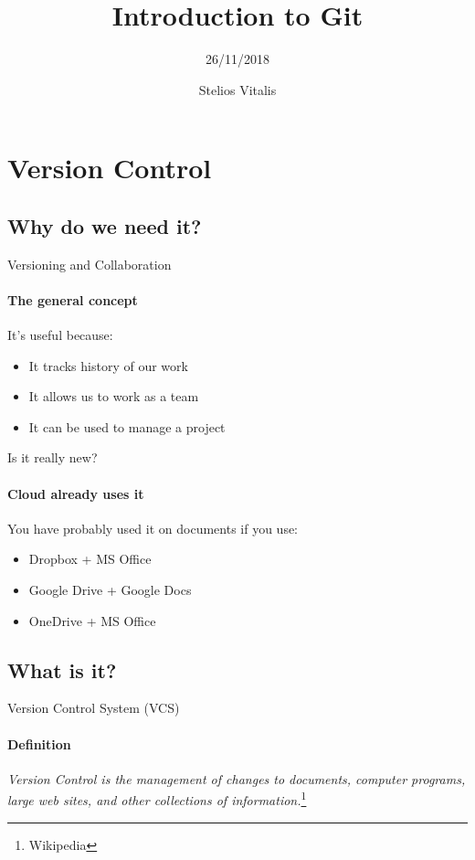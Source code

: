 \documentclass{beamer}
\title{Introduction to Git} %
\subtitle{26/11/2018} %
\author{Stelios Vitalis}
\begin{document}
  \frame{\maketitle}


	\section{Version Control}
\subsection{Why do we need it?}
\begin{frame}{Versioning and Collaboration}
\framesubtitle{The general concept}
It's useful because:
\begin{itemize}
	\item It tracks history of our work
	\item It allows us to work as a team
	\item It can be used to manage a project
\end{itemize}
\end{frame}

\begin{frame}{Is it really new?}
\framesubtitle{Cloud already uses it}
You have probably used it on documents if you use:
\begin{itemize}
\item Dropbox + MS Office
\item Google Drive + Google Docs
\item OneDrive + MS Office
\end{itemize}
\end{frame}

\subsection{What is it?}
\begin{frame}{Version Control System (VCS)}
\framesubtitle{Definition}

\begin{definition}
	\emph{Version Control is the \alert{management} of changes to documents, computer programs, large web sites, and other collections of information.}\footnote[frame]{Wikipedia}
\end{definition}
\end{frame}
\end{document}
